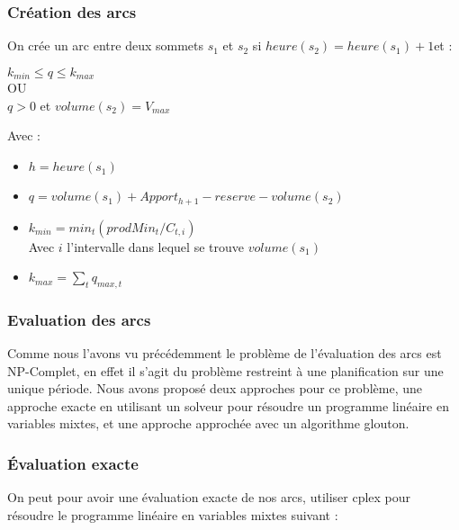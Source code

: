 \documentclass[a4paper]{report}
\begin{document}
\subsubsection*{Création des arcs}
On crée un arc entre deux sommets  $s_1$ et $s_2$ si $heure(s_2)=heure(s_1)+1 $et :
\begin{center}
 $k_{min} \leq q \leq k_{max}$ \\
OU\\
$q > 0$ et $ volume(s_2)=V_{max}$
\end{center}
Avec :\\
\begin{itemize}
\item $h=heure(s_1)$
\item $q = volume(s_1)+ Apport_{h+1} - reserve -volume(s_2)$
\item $k_{min}= min_t(prodMin_t/C_{t,i})$ \\
Avec $i$ l'intervalle dans lequel se trouve $volume(s_1)$ 
\item $k_{max}= \sum_t q_{max,t}$

 
\end{itemize}
\subsubsection*{Evaluation des arcs}
Comme nous l'avons vu précédemment le problème de l'évaluation des arcs est NP-Complet, en effet il s'agit du problème restreint à une planification sur une unique période. Nous avons proposé deux approches pour ce problème, une approche exacte en utilisant un solveur pour résoudre un programme linéaire en variables mixtes, et une approche approchée avec un algorithme glouton.
\subsubsection*{Évaluation exacte}
On peut pour avoir une évaluation exacte de nos arcs, utiliser cplex pour résoudre le programme linéaire en variables mixtes suivant :\\
\end{document}
